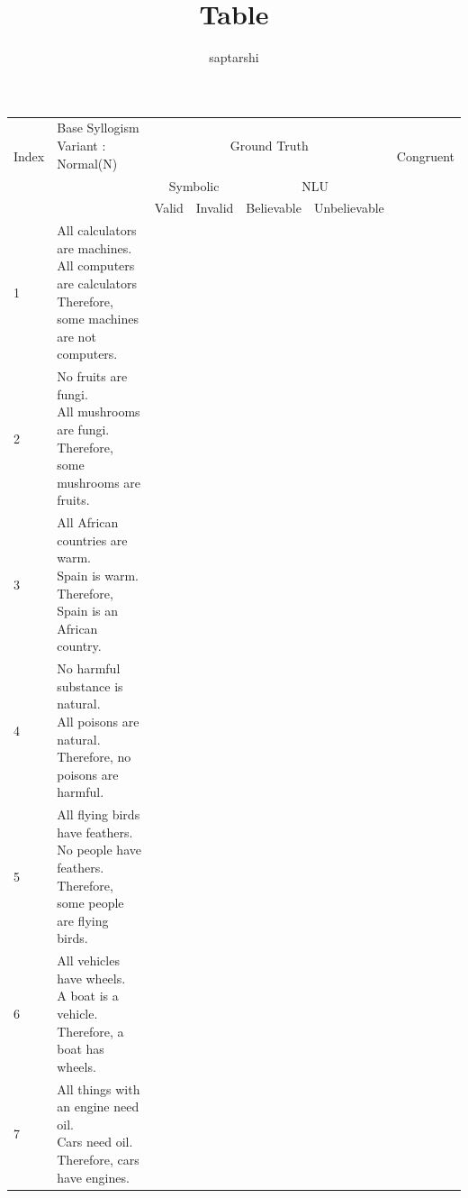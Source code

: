 \documentclass[10pt]{article}
\title{Table}
\author{saptarshi}
\newcommand{\ptick}{\ding{51}}
\newcommand{\pcross}{\ding{55}}
\begin{document}
	\maketitle
	
	\begin{center}
		\begin{tabular}{|l|l|c|c|c|c|c|}
			\toprule
			\multirow{2}{*}{Index} & \makecell{Base Syllogism \\  Variant : Normal(N)} & \multicolumn{4}{|c|}{Ground Truth} & \multirow{2}{*}{Congruent} \\
			\cline{3-6}
			& & \multicolumn{2}{|c|}{Symbolic} & \multicolumn{2}{|c|}{NLU} & \\
			\cline{3-6}
			& & Valid & Invalid & Believable & Unbelievable & \\
			\midrule
			1 & \makecell[l]{All calculators are machines. \\ All computers are calculators \\ Therefore, some machines are not computers.} &  & \ptick & \ptick&  & \pcross \\ \hline
			2 & \makecell[l]{No fruits are fungi.\\All mushrooms are fungi.\\Therefore, some mushrooms are fruits.} &  &\ptick & & \ptick& \ptick \\ \hline
			3 & \makecell[l]{All African countries are warm.\\Spain is warm.\\Therefore, Spain is an African country.} & & \ptick & & \ptick& \ptick \\ \hline
			4 & \makecell[l]{No harmful substance is natural.\\All poisons are natural.\\Therefore, no poisons are harmful.} & \ptick & & & \ptick& \pcross \\ \hline
			5 & \makecell[l]{All flying birds have feathers.\\No people have feathers.\\Therefore, some people are flying birds.} & &\ptick& &\ptick& \ptick \\ \hline
			6 & \makecell[l]{All vehicles have wheels.\\A boat is a vehicle.\\Therefore, a boat has wheels.} & \ptick &  & & \ptick& \pcross \\ \hline
			7 & \makecell[l]{All things with an engine need oil.\\Cars need oil.\\Therefore, cars have engines.} &  &\ptick & \ptick& &  \pcross \\ \hline

\end{tabular}
\end{center}
\end{document}
